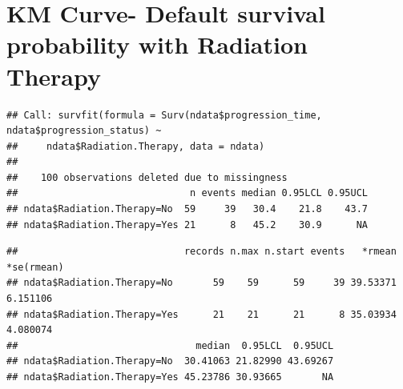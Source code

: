 \documentclass[
  11pt,
]{article}
\newenvironment{Shaded}{\begin{snugshade}}{\end{snugshade}}
\newcommand{\AttributeTok}[1]{\textcolor[rgb]{0.77,0.63,0.00}{#1}}
\newcommand{\FunctionTok}[1]{\textcolor[rgb]{0.00,0.00,0.00}{#1}}
\newcommand{\NormalTok}[1]{#1}
\newcommand{\OtherTok}[1]{\textcolor[rgb]{0.56,0.35,0.01}{#1}}
\newcommand{\SpecialCharTok}[1]{\textcolor[rgb]{0.00,0.00,0.00}{#1}}
\newcommand{\StringTok}[1]{\textcolor[rgb]{0.31,0.60,0.02}{#1}}
\begin{document}
\newpage
\section{KM Curve- Default survival probability with Radiation Therapy}

\begin{Shaded}
\end{Shaded}

\begin{verbatim}
## Call: survfit(formula = Surv(ndata$progression_time, ndata$progression_status) ~ 
##     ndata$Radiation.Therapy, data = ndata)
## 
##    100 observations deleted due to missingness 
##                              n events median 0.95LCL 0.95UCL
## ndata$Radiation.Therapy=No  59     39   30.4    21.8    43.7
## ndata$Radiation.Therapy=Yes 21      8   45.2    30.9      NA
\end{verbatim}

\begin{Shaded}
\end{Shaded}

\begin{verbatim}
##                             records n.max n.start events   *rmean *se(rmean)
## ndata$Radiation.Therapy=No       59    59      59     39 39.53371   6.151106
## ndata$Radiation.Therapy=Yes      21    21      21      8 35.03934   4.080074
##                               median  0.95LCL  0.95UCL
## ndata$Radiation.Therapy=No  30.41063 21.82990 43.69267
## ndata$Radiation.Therapy=Yes 45.23786 30.93665       NA
\end{verbatim}
\end{document}
